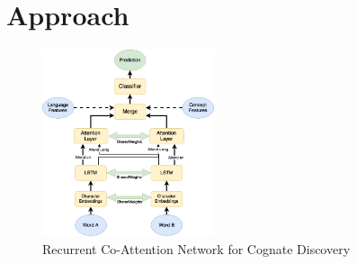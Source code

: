 \documentclass[11pt,letterpaper]{article}
\begin{document}




\section{Approach}

\begin{figure}[t]
	\centering
	\includegraphics[width=0.45\textwidth]{CoAttNetwork}
    \caption{Recurrent Co-Attention Network for Cognate Discovery}
    \label{CoAttNet}
\end{figure}
\end{document}
